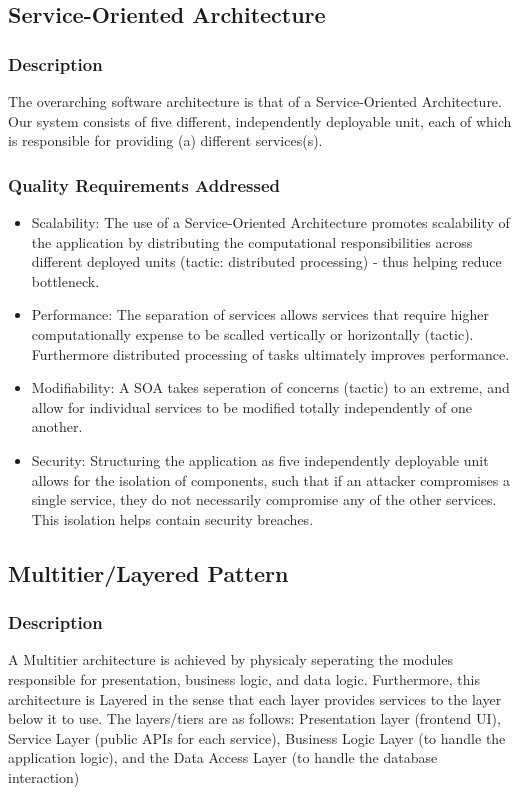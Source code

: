 \documentclass[12pt]{article}
\begin{document}
\subsection{Service-Oriented Architecture}
\subsubsection{Description}
The overarching software architecture is that of a Service-Oriented Architecture. Our system consists of five different, independently deployable unit, each of which is responsible for providing (a) different services(s).
\subsubsection{Quality Requirements Addressed}
\begin{itemize}
    \item Scalability: The use of a Service-Oriented Architecture promotes scalability of the application by distributing the computational responsibilities across different deployed units (tactic: distributed processing) - thus helping reduce bottleneck.
    \item Performance: The separation of services allows services that require higher computationally expense to be scalled vertically or horizontally (tactic). Furthermore distributed processing of tasks ultimately improves performance.
    \item Modifiability: A SOA takes seperation of concerns (tactic) to an extreme, and allow for individual services to be modified totally independently of one another.
    \item Security: Structuring the application as five independently deployable unit allows for the isolation of components, such that if an attacker compromises a single service, they do not necessarily compromise any of the other services. This isolation helps contain security breaches.
\end{itemize}
\subsection{Multitier/Layered Pattern}
\subsubsection{Description}
A Multitier architecture is achieved by physicaly seperating the modules responsible for presentation, business logic, and data logic. Furthermore, this architecture is Layered in the sense that each layer provides services to the layer below it to use. The layers/tiers are as follows: Presentation layer (frontend UI), Service Layer (public APIs for each service), Business Logic Layer (to handle the application logic), and the Data Access Layer (to handle the database interaction)
\end{document}
